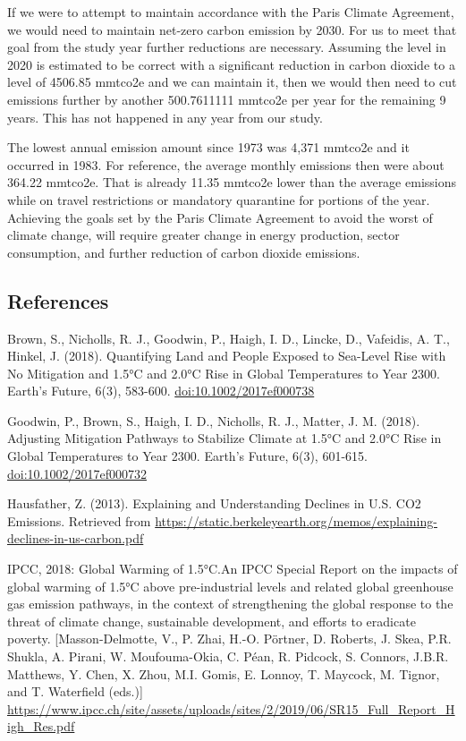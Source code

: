 \documentclass[
]{article}
\begin{document}
If we were to attempt to maintain accordance with the Paris Climate
Agreement, we would need to maintain net-zero carbon emission by 2030.
For us to meet that goal from the study year further reductions are
necessary. Assuming the level in 2020 is estimated to be correct with a
significant reduction in carbon dioxide to a level of 4506.85 mmtco2e
and we can maintain it, then we would then need to cut emissions further
by another 500.7611111 mmtco2e per year for the remaining 9 years. This
has not happened in any year from our study.

The lowest annual emission amount since 1973 was 4,371 mmtco2e and it
occurred in 1983. For reference, the average monthly emissions then were
about 364.22 mmtco2e. That is already 11.35 mmtco2e lower than the
average emissions while on travel restrictions or mandatory quarantine
for portions of the year. Achieving the goals set by the Paris Climate
Agreement to avoid the worst of climate change, will require greater
change in energy production, sector consumption, and further reduction
of carbon dioxide emissions.

\hypertarget{references}{%
\subsection{References}\label{references}}

Brown, S., Nicholls, R. J., Goodwin, P., Haigh, I. D., Lincke, D.,
Vafeidis, A. T., Hinkel, J. (2018). Quantifying Land and People Exposed
to Sea-Level Rise with No Mitigation and 1.5°C and 2.0°C Rise in Global
Temperatures to Year 2300. Earth's Future, 6(3), 583-600.
\url{doi:10.1002/2017ef000738}

Goodwin, P., Brown, S., Haigh, I. D., Nicholls, R. J., Matter, J. M.
(2018). Adjusting Mitigation Pathways to Stabilize Climate at 1.5°C and
2.0°C Rise in Global Temperatures to Year 2300. Earth's Future, 6(3),
601-615. \url{doi:10.1002/2017ef000732}

Hausfather, Z. (2013). Explaining and Understanding Declines in U.S. CO2
Emissions. Retrieved from
\url{https://static.berkeleyearth.org/memos/explaining-declines-in-us-carbon.pdf}

IPCC, 2018: Global Warming of 1.5°C.An IPCC Special Report on the
impacts of global warming of 1.5°C above pre-industrial levels and
related global greenhouse gas emission pathways, in the context of
strengthening the global response to the threat of climate change,
sustainable development, and efforts to eradicate poverty.
{[}Masson-Delmotte, V., P. Zhai, H.-O. Pörtner, D. Roberts, J. Skea,
P.R. Shukla, A. Pirani, W. Moufouma-Okia, C. Péan, R. Pidcock, S.
Connors, J.B.R. Matthews, Y. Chen, X. Zhou, M.I. Gomis, E. Lonnoy, T.
Maycock, M. Tignor, and T. Waterfield (eds.){]}
\url{https://www.ipcc.ch/site/assets/uploads/sites/2/2019/06/SR15_Full_Report_High_Res.pdf}
\end{document}
